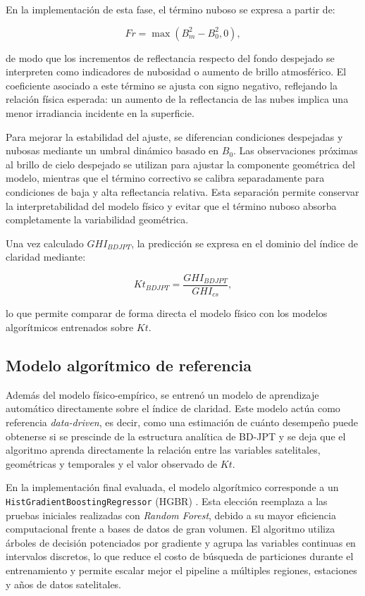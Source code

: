 \documentclass[../main.tex]{subfiles}
\begin{document}
En la implementación de esta fase, el término nuboso se expresa a partir de:

\begin{equation}
Fr = \max(B_m^2 - B_0^2, 0),
\end{equation}

de modo que los incrementos de reflectancia respecto del fondo despejado se interpreten como indicadores de nubosidad o aumento de brillo atmosférico. El coeficiente asociado a este término se ajusta con signo negativo, reflejando la relación física esperada: un aumento de la reflectancia de las nubes implica una menor irradiancia incidente en la superficie.

Para mejorar la estabilidad del ajuste, se diferencian condiciones despejadas y nubosas mediante un umbral dinámico basado en $B_0$. Las observaciones próximas al brillo de cielo despejado se utilizan para ajustar la componente geométrica del modelo, mientras que el término correctivo se calibra separadamente para condiciones de baja y alta reflectancia relativa. Esta separación permite conservar la interpretabilidad del modelo físico y evitar que el término nuboso absorba completamente la variabilidad geométrica.

Una vez calculado $GHI_{BDJPT}$, la predicción se expresa en el dominio del índice de claridad mediante:

\begin{equation}
Kt_{BDJPT} =
\frac{GHI_{BDJPT}}{GHI_{cs}},
\end{equation}

lo que permite comparar de forma directa el modelo físico con los modelos algorítmicos entrenados sobre $Kt$.

\subsection{Modelo algorítmico de referencia}

Además del modelo físico-empírico, se entrenó un modelo de aprendizaje automático directamente sobre el índice de claridad. Este modelo actúa como referencia \textit{data-driven}, es decir, como una estimación de cuánto desempeño puede obtenerse si se prescinde de la estructura analítica de BD-JPT y se deja que el algoritmo aprenda directamente la relación entre las variables satelitales, geométricas y temporales y el valor observado de $Kt$.

En la implementación final evaluada, el modelo algorítmico corresponde a un \texttt{HistGradientBoostingRegressor} (HGBR) \cite{scikit-learn}. Esta elección reemplaza a las pruebas iniciales realizadas con \textit{Random Forest}, debido a su mayor eficiencia computacional frente a bases de datos de gran volumen. El algoritmo utiliza árboles de decisión potenciados por gradiente y agrupa las variables continuas en intervalos discretos, lo que reduce el costo de búsqueda de particiones durante el entrenamiento y permite escalar mejor el pipeline a múltiples regiones, estaciones y años de datos satelitales.
\end{document}
